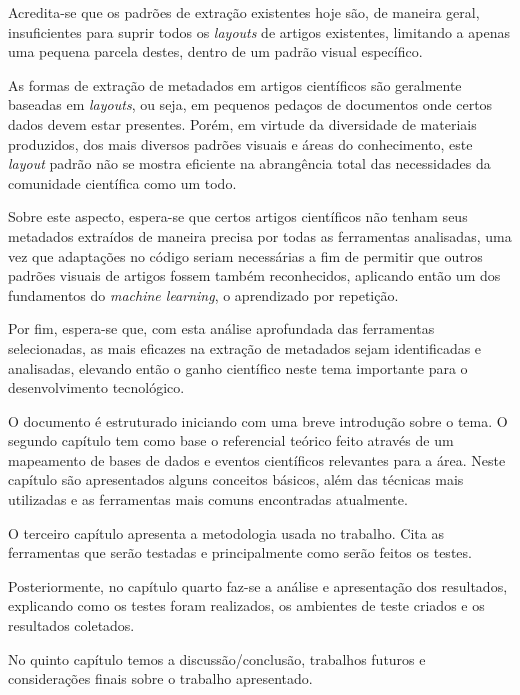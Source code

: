 Acredita-se que os padrões de extração existentes hoje são, de maneira geral, insuficientes para suprir todos os \emph{layouts} de artigos existentes, limitando a apenas uma pequena parcela destes, dentro de um padrão visual específico.

As formas de extração de metadados em artigos científicos são geralmente baseadas em \textit{layouts}, ou seja, em pequenos pedaços de documentos onde certos dados devem estar presentes. Porém, em virtude da diversidade de materiais produzidos, dos mais diversos padrões visuais e áreas do conhecimento, este \textit{layout} padrão não se mostra eficiente na abrangência total das necessidades da comunidade científica como um todo. 

Sobre este aspecto, espera-se que certos artigos científicos não tenham seus metadados extraídos de maneira precisa por todas as ferramentas analisadas, uma vez que adaptações no código seriam necessárias a fim de permitir que outros padrões visuais de artigos fossem também reconhecidos, aplicando então um dos fundamentos do \textit{machine learning}, o aprendizado por repetição. 

Por fim, espera-se que, com esta análise aprofundada das ferramentas selecionadas, as mais eficazes na extração de metadados sejam identificadas e analisadas, elevando então o ganho científico neste tema importante para o desenvolvimento tecnológico.

O documento é estruturado iniciando com uma breve introdução sobre o tema.
O segundo capítulo tem como base o referencial teórico feito através de um mapeamento de bases de dados e eventos científicos relevantes para a área. Neste capítulo são apresentados alguns conceitos básicos, além das técnicas mais utilizadas e as ferramentas mais comuns encontradas atualmente.

O terceiro capítulo apresenta a metodologia usada no trabalho. Cita as ferramentas que serão testadas e principalmente como serão feitos os testes. 

Posteriormente, no capítulo quarto faz-se a análise e apresentação dos resultados, explicando como os testes foram realizados, os ambientes de teste criados e os resultados coletados.

No quinto capítulo temos a discussão/conclusão, trabalhos futuros e considerações finais sobre o trabalho apresentado.


